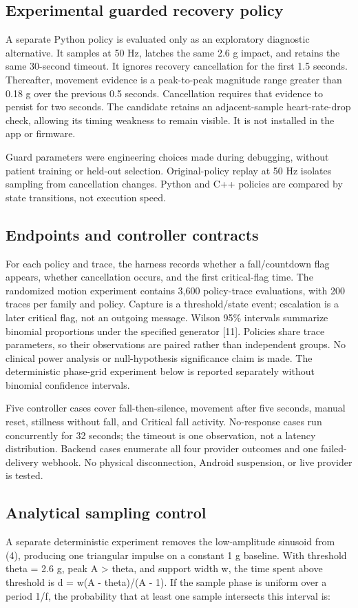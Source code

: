 \documentclass[journal]{IEEEtran}
\begin{document}
\subsection{Experimental guarded recovery policy}
A separate Python policy is evaluated only as an exploratory diagnostic alternative. It samples at 50 Hz, latches the same 2.6 g impact, and retains the same 30-second timeout. It ignores recovery cancellation for the first 1.5 seconds. Thereafter, movement evidence is a peak-to-peak magnitude range greater than 0.18 g over the previous 0.5 seconds. Cancellation requires that evidence to persist for two seconds. The candidate retains an adjacent-sample heart-rate-drop check, allowing its timing weakness to remain visible. It is not installed in the app or firmware.

Guard parameters were engineering choices made during debugging, without patient training or held-out selection. Original-policy replay at 50 Hz isolates sampling from cancellation changes. Python and C++ policies are compared by state transitions, not execution speed.

\subsection{Endpoints and controller contracts}
For each policy and trace, the harness records whether a fall/countdown flag appears, whether cancellation occurs, and the first critical-flag time. The randomized motion experiment contains 3,600 policy-trace evaluations, with 200 traces per family and policy. Capture is a threshold/state event; escalation is a later critical flag, not an outgoing message. Wilson 95\% intervals summarize binomial proportions under the specified generator [11]. Policies share trace parameters, so their observations are paired rather than independent groups. No clinical power analysis or null-hypothesis significance claim is made. The deterministic phase-grid experiment below is reported separately without binomial confidence intervals.

Five controller cases cover fall-then-silence, movement after five seconds, manual reset, stillness without fall, and Critical fall activity. No-response cases run concurrently for 32 seconds; the timeout is one observation, not a latency distribution. Backend cases enumerate all four provider outcomes and one failed-delivery webhook. No physical disconnection, Android suspension, or live provider is tested.

\subsection{Analytical sampling control}
A separate deterministic experiment removes the low-amplitude sinusoid from (4), producing one triangular impulse on a constant 1 g baseline. With threshold theta = 2.6 g, peak A > theta, and support width w, the time spent above threshold is d = w(A - theta)/(A - 1). If the sample phase is uniform over a period 1/f, the probability that at least one sample intersects this interval is:
\end{document}
